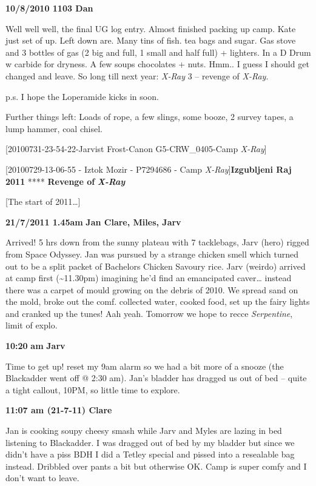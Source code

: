 \textbf{10/8/2010 1103 Dan}

Well well well, the final UG log entry. Almost finished packing up camp.
Kate just set of up. Left down are. Many tins of fish. tea bags and
sugar. Gas stove and 3 bottles of gas (2 big and full, 1 small and half
full) + lighters. In a D Drum w carbide for dryness. A few soups
chocolates + nuts. Hmm.. I guess I should get changed and leave. So long
till next year: \emph{X-Ray} 3 -- revenge of \emph{X-Ray}.

p.s. I hope the Loperamide kicks in soon.

Further things left: Loads of rope, a few slings, some booze, 2 survey
tapes, a lump hammer, coal chisel.

{[}20100731-23-54-22-Jarvist Frost-Canon G5-CRW\_0405-Camp
\emph{X-Ray}{]}

{[}20100729-13-06-55 - Iztok Mozir - P7294686 - Camp
\emph{X-Ray}{]}\textbf{Izgubljeni Raj 2011} **** \textbf{Revenge of}
\textbf{\emph{X-Ray}}

{[}The start of 2011\ldots{}{]}

\textbf{21/7/2011 1.45am} \textbf{Jan Clare, Miles, Jarv}

Arrived! 5 hrs down from the sunny plateau with 7 tacklebags, Jarv
(hero) rigged from Space Odyssey. Jan was pursued by a strange chicken
smell which turned out to be a split packet of Bachelors Chicken Savoury
rice. Jarv (weirdo) arrived at camp first (\textasciitilde{}11.30pm)
imagining he'd find an emancipated caver\ldots{} instead there was a
carpet of mould growing on the debris of 2010. We spread sand on the
mold, broke out the comf. collected water, cooked food, set up the fairy
lights and cranked up the tunes! Aah yeah. Tomorrow we hope to recce
\emph{Serpentine}, limit of explo.

\textbf{10:20} \textbf{am} \textbf{Jarv}

Time to get up! reset my 9am alarm so we had a bit more of a snooze (the
Blackadder went off @ 2:30 am). Jan's bladder has dragged us out of bed
-- quite a tight callout, 10PM, so little time to explore.

\textbf{11:07 am (21-7-11) Clare}

Jan is cooking soupy cheesy smash while Jarv and Myles are lazing in bed
listening to Blackadder. I was dragged out of bed by my bladder but
since we didn't have a piss BDH I did a Tetley special and pissed into a
resealable bag instead. Dribbled over pants a bit but otherwise OK. Camp
is super comfy and I don't want to leave.

